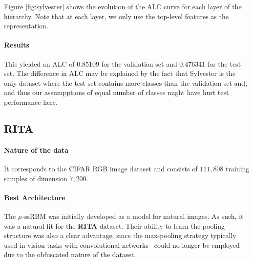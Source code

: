 Figure \ref{fig:sylvester} shows the evolution of the ALC curve for each layer of the
hierarchy.  Note that at each layer, we only use the top-level features as the
representation.

\paragraph{Results}

This yielded an ALC of $0.85109$ for the validation set and $0.476341$ for the test set.
The difference in ALC may be explained by the fact that Sylvester is the only dataset where
the test set contains more classes than the validation set and, and thus our
assumpptions of equal number of classes might have hurt test performance here.


\subsection{RITA}



\paragraph{Nature of the data} It corresponds to the CIFAR RGB image dataset and consists of $111,808$ training samples of dimension $7,200$.

\paragraph{Best Architecture}



The $\mu$-ssRBM was initially developed as a model for natural images. As such,
it was a natural fit for the {\bf RITA} dataset. Their ability to learn the pooling
structure was also a clear advantage, since the max-pooling strategy typically
used in vision tasks with convolutional networks~\cite{LeCun98-small} could no longer be employed due to the
obfuscated nature of the dataset.

